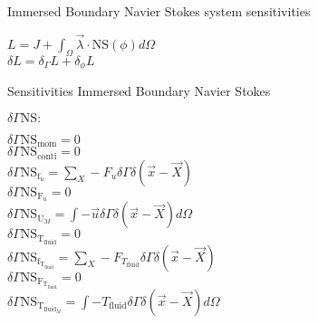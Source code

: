 \documentclass[10pt]{article} %
\begin{document}
\begin{center}
\begin{flushleft}
	Immersed Boundary Navier Stokes system sensitivities
\end{flushleft}
$L = J + \int_{\Omega} \vec{\lambda} \cdot \text{NS}(\phi)  d\Omega$\\
$\delta L = \delta_\Gamma L + \delta_\phi L$\\
\begin{flushleft}
	Sensitivities Immersed Boundary Navier Stokes
\end{flushleft}
\begin{flushleft}
	$\delta \Gamma \text{NS}:$
\end{flushleft}
	$\delta \Gamma \text{NS}_{\text{mom}} = 0$\\
	$\delta \Gamma \text{NS}_{\text{conti}} = 0$\\
	$\delta \Gamma \text{NS}_{\text{f}_u} = \sum_X -F_u \delta \Gamma \delta(\vec{x}-\vec{X})$\\
	$\delta \Gamma \text{NS}_{\text{F}_u} = 0$\\
	$\delta \Gamma \text{NS}_{\text{U}_M} = \int -\vec{u} \delta \Gamma \delta (\vec{x}-\vec{X}) d\Omega$\\
	$\delta \Gamma \text{NS}_{\text{T}_{\text{fluid}}} = 0$\\
	$\delta \Gamma \text{NS}_{\text{f}_{\text{T}_{\text{fluid}}}} = \sum_X -F_{T_{\text{fluid}}} \delta \Gamma \delta(\vec{x}-\vec{X})$\\
	$\delta \Gamma \text{NS}_{\text{F}_{\text{T}_{\text{fluid}}}} = 0$\\
	$\delta \Gamma \text{NS}_{\text{T}_{\text{fluid}_M}} = \int -T_{\text{fluid}} \delta \Gamma \delta (\vec{x}-\vec{X})d\Omega$\\
\end{center}
\end{document}
